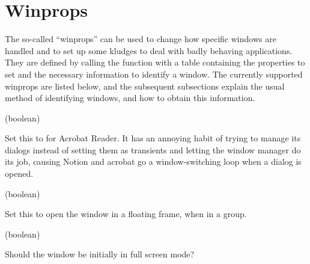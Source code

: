 \section{Winprops}
\label{sec:winprops}

The so-called ``winprops'' can be used to change how
specific windows are handled and to set up some kludges to deal with
badly behaving applications. They are defined by calling the function
 with a table containing the properties to set and the
necessary information to identify a window. The currently supported
winprops are listed below, and the subsequent subsections explain the
usual method of identifying windows, and how to obtain this information.


\newenvironment{winprop}[2]{
  \begin{function}%
      \item[Winprop:] \var{#1} (#2)
      \item[Description:]
}
{
  \end{function}
}


\begin{winprop}{acrobatic}{boolean}
    Set this to  for Acrobat Reader. It has an annoying
    habit of trying to manage its dialogs instead of setting them as
    transients and letting the window manager do its job, causing
    Notion and acrobat go a window-switching loop when a dialog is
    opened. 
\end{winprop}


\begin{winprop}{float}{boolean}
    Set this to open the window in a floating frame, when
    in a group.
\end{winprop}


\begin{winprop}{fullscreen}{boolean}
    Should the window be initially in full screen mode?
\end{winprop}


